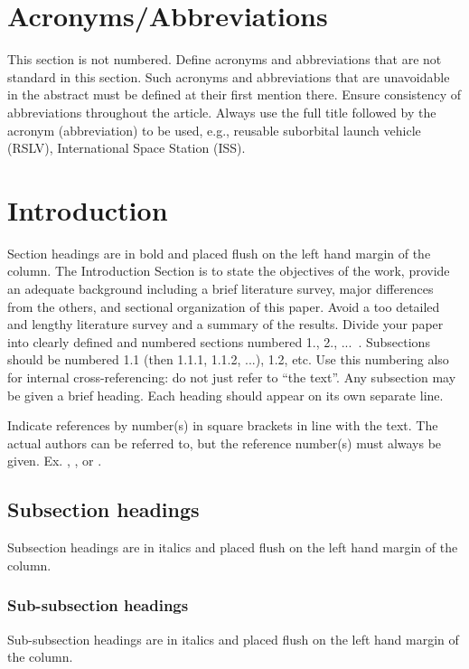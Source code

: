 \documentclass[]{IAC_style}
\begin{document}
\section*{Acronyms/Abbreviations}
This section is not numbered. Define acronyms and abbreviations that are not standard in this section. Such acronyms and abbreviations that are unavoidable in the abstract must be defined at their first mention there. Ensure consistency of abbreviations throughout the article. Always use the full title followed by the acronym (abbreviation) to be used, e.g., reusable suborbital launch vehicle (RSLV), International Space Station (ISS).


\section{Introduction}
Section headings are in bold and placed flush on the left hand margin of the column.
The Introduction Section is to state the objectives of the work, provide an adequate background including a brief literature survey, major differences from the others, and sectional organization of this paper. Avoid a too detailed and lengthy literature survey and a summary of the results.
Divide your paper into clearly defined and numbered sections numbered 1., 2., ...~. Subsections should be numbered 1.1 (then 1.1.1, 1.1.2, ...), 1.2, etc. Use this numbering also for internal cross-referencing: do not just refer to “the text”. Any subsection may be given a brief heading. Each heading should appear on its own separate line.

Indicate references by number(s) in square brackets in line with the text. The actual authors can be referred to, but the reference number(s) must always be given.
Ex. \cite{chang2015space}, \cite{van2010art}, \cite{mettam2009chapter,strunk2000elements} or \cite{mettam2009chapter,strunk2000elements,mack2015virgin}.

\subsection{Subsection headings}
Subsection headings are in italics and placed flush on the left hand margin of the column.

\subsubsection{Sub-subsection headings}
Sub-subsection headings are in italics and placed flush on the left hand margin of the column.
\end{document}
